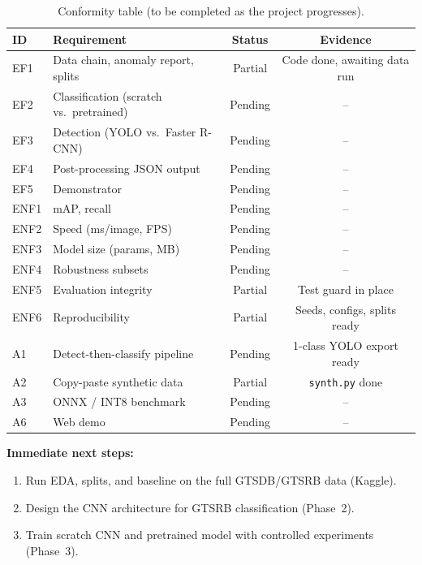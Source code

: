 \documentclass[12pt,a4paper]{article}
\begin{document}
\begin{table}[H]
\centering
\renewcommand{\arraystretch}{1.3}
\begin{tabular}{llcc}
\toprule
\textbf{ID} & \textbf{Requirement} & \textbf{Status} & \textbf{Evidence} \\
\midrule
EF1 & Data chain, anomaly report, splits         & Partial & Code done, awaiting data run \\
EF2 & Classification (scratch vs.\ pretrained)   & Pending & -- \\
EF3 & Detection (YOLO vs.\ Faster R-CNN)         & Pending & -- \\
EF4 & Post-processing JSON output                & Pending & -- \\
EF5 & Demonstrator                               & Pending & -- \\
\midrule
ENF1 & mAP, recall                               & Pending & -- \\
ENF2 & Speed (ms/image, FPS)                      & Pending & -- \\
ENF3 & Model size (params, MB)                    & Pending & -- \\
ENF4 & Robustness subsets                         & Pending & -- \\
ENF5 & Evaluation integrity                      & Partial & Test guard in place \\
ENF6 & Reproducibility                            & Partial & Seeds, configs, splits ready \\
\midrule
A1  & Detect-then-classify pipeline              & Pending & 1-class YOLO export ready \\
A2  & Copy-paste synthetic data                  & Partial & \texttt{synth.py} done \\
A3  & ONNX / INT8 benchmark                      & Pending & -- \\
A6  & Web demo                                   & Pending & -- \\
\bottomrule
\end{tabular}
\caption{Conformity table (to be completed as the project progresses).}
\label{tab:conformity}
\end{table}

\textbf{Immediate next steps:}
\begin{enumerate}[leftmargin=2em]
  \item Run EDA, splits, and baseline on the full GTSDB/GTSRB data (Kaggle).
  \item Design the CNN architecture for GTSRB classification (Phase~2).
  \item Train scratch CNN and pretrained model with controlled experiments (Phase~3).
\end{enumerate}

\end{document}
